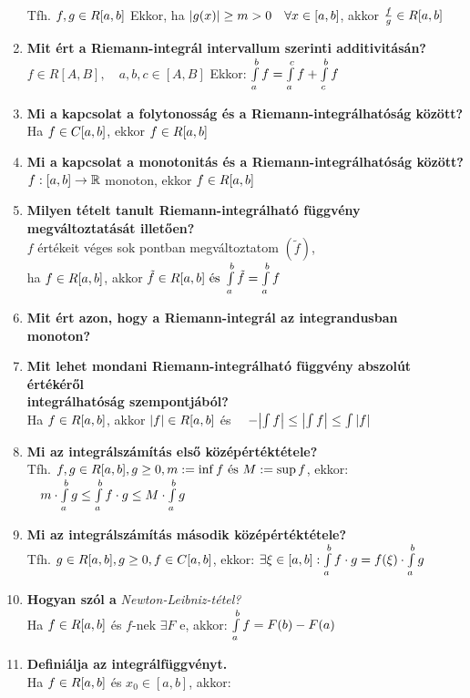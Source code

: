 \documentclass[a4paper,11pt]{article}
\begin{document}
\begin{enumerate}
	Tfh. $f,g\in R[a,b]$ Ekkor, ha $\abs{g(x)}\geq m>0\quad\forall x\in[a,b]$, akkor $\frac{f}{g}\in R[a,b]$
	\item\textbf{Mit ért a Riemann-integrál intervallum szerinti additivitásán?}\\[0.1cm]
	$f\in R[A,B],\quad a,b,c\in[A,B]$ Ekkor: $\int\limits_{a}^{b} f=\int\limits_a^cf+
	\int\limits_c^bf$
	\item\textbf{Mi a kapcsolat a folytonosság és a Riemann-integrálhatóság között?}\\[0.1cm]
	Ha $f\in C[a,b]$, ekkor $f\in R[a,b]$
	\item\textbf{Mi a kapcsolat a monotonitás és a Riemann-integrálhatóság között?}\\[0.1cm]
	$f:[a,b]\to\mathbb{R}$ monoton, ekkor $f\in R[a,b]$
	\item\textbf{Milyen tételt tanult Riemann-integrálható függvény
	megváltoztatását illetően?}\\[0.1cm]
	$f$ értékeit véges sok pontban megváltoztatom $(\tilde{f})$,\\[0.2cm]ha
	$f\in R[a,b]$, akkor $\tilde{f}\in R[a,b]\text{ és }\int\limits_{a}^{b}\tilde{f}=\int\limits_{a}^{b} f$\newpage
	\item\textbf{Mit ért azon, hogy a Riemann-integrál az integrandusban
	monoton?}\\[0.1cm]
	\item\textbf{Mit lehet mondani Riemann-integrálható függvény abszolút
	értékéről \\ integrálhatóság szempontjából?}\\[0.1cm]
	Ha $f\in R[a,b]$, akkor $\abs{f}\in R[a,b]$ és $\quad-\abs{\int f}\leq\abs{\int f}
	\leq\int\abs{f}$
	\item\textbf{Mi az integrálszámítás első középértéktétele?}\\[0.1cm]
	Tfh. $f,g\in R[a,b],g\geq0,m:=\inf f\text{ és }M:=\sup f$, ekkor:
	$\quad m\cdot\int\limits_{a}^{b} g\leq\int\limits_{a}^{b} f\cdot g\leq M\cdot\int\limits_{a}^{b} g$
	\item\textbf{Mi az integrálszámítás második középértéktétele?}\\[0.1cm]
	Tfh. $g\in R[a,b],g\geq0,f\in C[a,b]$, ekkor: $\exists\xi\in[a,b]:\int\limits_{a}^{b} f\cdot g=
	f(\xi)\cdot\int\limits_{a}^{b} g$
	\item\textbf{Hogyan szól a} \textit{Newton-Leibniz-tétel?}\\[0.1cm]
	Ha $f\in R[a,b]$ és $f$-nek $\exists F$ \prfv e, akkor: $\int\limits_{a}^{b} f=F(b)-F(a)$
	\item\textbf{Definiálja az integrálfüggvényt.}\\[0.1cm]
	Ha $f\in R[a,b]$ és $x_0\in[a,b]$, akkor:

\end{enumerate}
\end{document}
